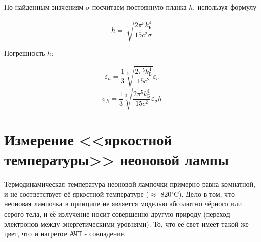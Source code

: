 	По найденным значениям $\sigma$ посчитаем постоянную планка $h$, используя формулу

	\[ h = \sqrt[3]{\frac{2 \pi^5 k_{\text{Б}}^4}{15 c^2 \sigma}} \]

	Погрешность $h$:

	\[ \varepsilon_h = \frac{1}{3} \sqrt[3]{\frac{2 \pi^5 k_{\text{Б}}^4}{15 c^2 }} \varepsilon_{\sigma} \]
	\[ \sigma_h = \frac{1}{3} \sqrt[3]{\frac{2 \pi^5 k_{\text{Б}}^4}{15 c^2 }} \varepsilon_{\sigma} h \]

	\begin{center}
	\end{center}

	\section*{Измерение <<яркостной температуры>> неоновой лампы}

	Термодинамическая температура неоновой лампочки примерно равна комнатной, и не соответствует её яркостной температуре ($\approx$ 820$^{\circ}$C). 
	Дело в том, что неоновая лампочка в принципе не является моделью абсолютно чёрного или серого тела, 
	и её излучение носит совершенно другую природу (переход электронов между энергетическими уровнями). 
	То, что её свет имеет такой же цвет, что и нагретое АЧТ - совпадение.
